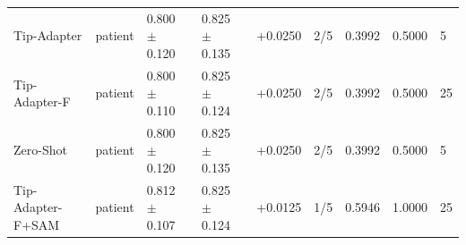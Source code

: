 \begin{table}[t]
{\begin{tabular}{lllllllll}
Tip-Adapter & patient & 0.800 $\pm$ 0.120 & 0.825 $\pm$ 0.135 & +0.0250 & 2/5 & 0.3992 & 0.5000 & 5 \\
Tip-Adapter-F & patient & 0.800 $\pm$ 0.110 & 0.825 $\pm$ 0.124 & +0.0250 & 2/5 & 0.3992 & 0.5000 & 25 \\
Zero-Shot & patient & 0.800 $\pm$ 0.120 & 0.825 $\pm$ 0.135 & +0.0250 & 2/5 & 0.3992 & 0.5000 & 5 \\
Tip-Adapter-F+SAM & patient & 0.812 $\pm$ 0.107 & 0.825 $\pm$ 0.124 & +0.0125 & 1/5 & 0.5946 & 1.0000 & 25 \\
\bottomrule
\end{tabular}}
\end{table}
